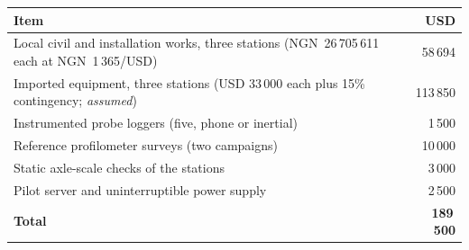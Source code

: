 \begin{tabularx}{\textwidth}{@{}X r@{}}
\toprule
\textbf{Item} & \textbf{USD}\\
\midrule
Local civil and installation works, three stations (NGN~26\,705\,611 each at NGN~1\,365/USD) & 58\,694\\
Imported equipment, three stations (USD 33\,000 each plus 15\% contingency; \emph{assumed}) & 113\,850\\
Instrumented probe loggers (five, phone or inertial) & 1\,500\\
Reference profilometer surveys (two campaigns) & 10\,000\\
Static axle-scale checks of the stations & 3\,000\\
Pilot server and uninterruptible power supply & 2\,500\\
\midrule
\textbf{Total} & \textbf{189\,500}\\
\bottomrule
\end{tabularx}
